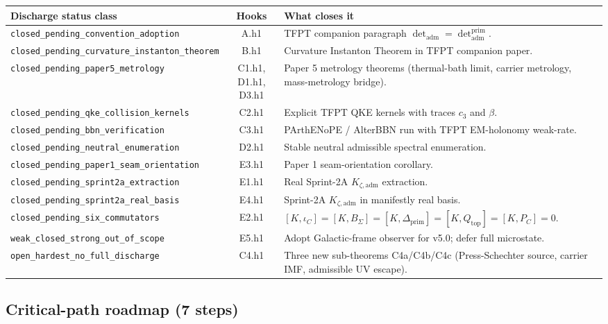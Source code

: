 \documentclass[11pt,a4paper]{article}
\begin{document}
\begin{center}
\renewcommand{\arraystretch}{1.13}
\begin{tabularx}{\textwidth}{@{}p{}cY@{}}
\toprule
\textbf{Discharge status class} & \textbf{Hooks} & \textbf{What closes it} \\
\midrule
\texttt{closed\_pending\_convention\_adoption}        & A.h1
& TFPT companion paragraph \(\det_{\mathrm{adm}}=\det_{\mathrm{adm}}^{\mathrm{prim}}\). \\
\texttt{closed\_pending\_curvature\_instanton\_theorem} & B.h1
& Curvature Instanton Theorem in TFPT companion paper. \\
\texttt{closed\_pending\_paper5\_metrology}            & C1.h1, D1.h1, D3.h1
& Paper 5 metrology theorems (thermal-bath limit, carrier metrology,
mass-metrology bridge). \\
\texttt{closed\_pending\_qke\_collision\_kernels}      & C2.h1
& Explicit TFPT QKE kernels with traces \(c_3\) and \(\beta\). \\
\texttt{closed\_pending\_bbn\_verification}            & C3.h1
& PArthENoPE / AlterBBN run with TFPT EM-holonomy weak-rate. \\
\texttt{closed\_pending\_neutral\_enumeration}         & D2.h1
& Stable neutral admissible spectral enumeration. \\
\texttt{closed\_pending\_paper1\_seam\_orientation}    & E3.h1
& Paper 1 seam-orientation corollary. \\
\texttt{closed\_pending\_sprint2a\_extraction}         & E1.h1
& Real Sprint-2A \(K_{\zeta,\mathrm{adm}}\) extraction. \\
\texttt{closed\_pending\_sprint2a\_real\_basis}        & E4.h1
& Sprint-2A \(K_{\zeta,\mathrm{adm}}\) in manifestly real basis. \\
\texttt{closed\_pending\_six\_commutators}             & E2.h1
& \([K,\iota_C]=[K,B_\Sigma]=[K,\Delta_{\mathrm{prim}}]
=[K,Q_{\mathrm{top}}]=[K,P_C]=0\). \\
\texttt{weak\_closed\_strong\_out\_of\_scope}          & E5.h1
& Adopt Galactic-frame observer for v5.0; defer full microstate. \\
\texttt{open\_hardest\_no\_full\_discharge}            & C4.h1
& Three new sub-theorems C4a/C4b/C4c (Press-Schechter source,
carrier IMF, admissible UV escape). \\
\bottomrule
\end{tabularx}
\end{center}

\subsection{Critical-path roadmap (7 steps)}
\end{document}
